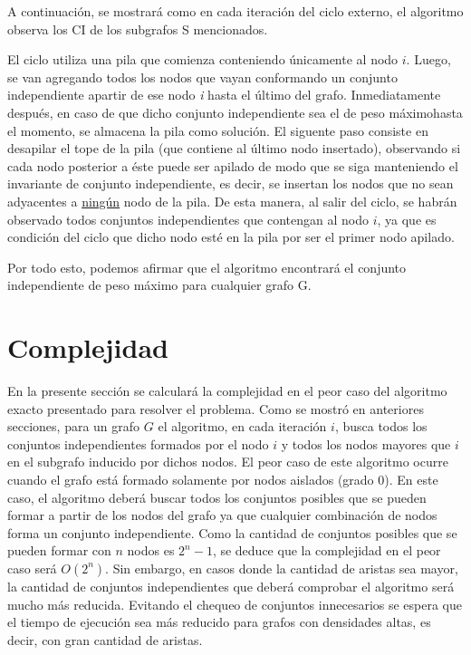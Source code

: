 \documentclass[a4paper,11pt] {article}
\begin{document}
A continuación, se mostrará como en cada iteración del ciclo externo, el algoritmo observa los CI de los subgrafos S mencionados.

El ciclo utiliza una pila que comienza conteniendo únicamente al nodo $i$. Luego, se van agregando todos los nodos que vayan conformando un conjunto independiente apartir de ese nodo \textit{i} hasta el último del grafo.
Inmediatamente después, en caso de que dicho conjunto independiente sea el de peso máximo\footnotemark[2] hasta el momento, se almacena la pila como solución. El siguente paso consiste en desapilar el tope de la pila (que contiene al último nodo insertado), observando si cada nodo posterior a éste puede ser apilado de modo que se siga manteniendo el invariante de conjunto independiente, es decir, se insertan los nodos que no sean adyacentes a \underline{ningún} nodo de la pila. De esta manera, al salir del ciclo, se habrán observado todos conjuntos independientes que contengan al nodo $i$, ya que es condición del ciclo que dicho nodo esté en la pila por ser el primer nodo apilado.

Por todo esto, podemos afirmar que el algoritmo encontrará el conjunto independiente de peso máximo para cualquier grafo G.


\section*{Complejidad}

En la presente secci\'on se calcular\'a la complejidad en el peor caso del algoritmo exacto presentado para resolver el problema. Como se mostr\'o en anteriores secciones, para un grafo $G$ el algoritmo, en cada iteraci\'on $i$, busca todos los conjuntos independientes formados por el nodo $i$ y todos los nodos mayores que $i$ en el subgrafo inducido por dichos nodos. El peor caso de este algoritmo ocurre cuando el grafo est\'a formado solamente por nodos aislados (grado 0). En este caso, el algoritmo deber\'a buscar todos los conjuntos posibles que se pueden formar a partir de los nodos del grafo ya que cualquier combinaci\'on de nodos forma un conjunto independiente. Como la cantidad de conjuntos posibles que se pueden formar con $n$ nodos es $2^{n}-1$, se deduce que la complejidad en el peor caso ser\'a $O(2^{n})$. Sin embargo, en casos donde la cantidad de aristas sea mayor, la cantidad de conjuntos independientes que deber\'a comprobar el algoritmo ser\'a mucho m\'as reducida. Evitando el chequeo de conjuntos innecesarios se espera que el tiempo de ejecuci\'on sea m\'as reducido para grafos con densidades altas, es decir, con gran cantidad de aristas.
\end{document}
